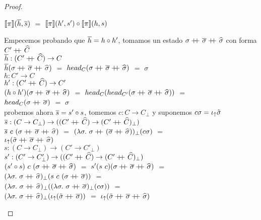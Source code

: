 \begin{proof}
\begin{itemize}
\begin{itemize}
\begin{center}
$\llbracket \pi \rrbracket(\overline{h},\overline{s})$ $=$ $\llbracket \pi \rrbracket(h',s') \circ \llbracket \pi \rrbracket(h,s)$
\end{center}

Empecemos probando que $\overline{h} = h \circ h'$, tomamos un estado 
$\sigma +\kern-1.3ex+\kern0.8ex \overline{\sigma} +\kern-1.3ex+\kern0.8ex \widehat{\sigma}$ con forma $C' +\kern-1.3ex+\kern0.8ex \widehat{C}$\\

$\overline{h} : (C' +\kern-1.3ex+\kern0.8ex \widehat{C}) \rightarrow C$\\
$\overline{h} (\sigma +\kern-1.3ex+\kern0.8ex \overline{\sigma} +\kern-1.3ex+\kern0.8ex \widehat{\sigma})$ $=$ 
$head_{C} (\sigma +\kern-1.3ex+\kern0.8ex \overline{\sigma} +\kern-1.3ex+\kern0.8ex \widehat{\sigma})$ $=$ $\sigma$\\

$h : C' \rightarrow C$\\
$h' : (C' +\kern-1.3ex+\kern0.8ex \widehat{C}) \rightarrow C'$\\
$(h \circ h') (\sigma +\kern-1.3ex+\kern0.8ex \overline{\sigma} +\kern-1.3ex+\kern0.8ex \widehat{\sigma})$ $=$
$head_{C}(head_{C'} (\sigma +\kern-1.3ex+\kern0.8ex \overline{\sigma} +\kern-1.3ex+\kern0.8ex \widehat{\sigma}))$ $=$\\
$head_{C}(\sigma +\kern-1.3ex+\kern0.8ex \overline{\sigma})$ $=$ $\sigma$\\

probemos ahora $\overline{s} = s' \circ s$, tomemos $c : C \rightarrow C_\bot$ y
suponemos $c \sigma = \iota_{\uparrow} \tilde{\sigma}$\\

$\overline{s} : (C \rightarrow C_\bot) \rightarrow 
		  ((C' +\kern-1.3ex+\kern0.8ex \widehat{C}) \rightarrow (C' +\kern-1.3ex+\kern0.8ex \widehat{C})_\bot)$\\
$\overline{s} \ c \ (\sigma +\kern-1.3ex+\kern0.8ex \overline{\sigma} +\kern-1.3ex+\kern0.8ex \widehat{\sigma})$ $=$
$(\lambda \sigma . \ 
	\sigma \concat (\sigmaover \concat \sigmahat))_{\bot} (c \sigma)$ $=$\\
$\iota_{\uparrow} (\tilde{\sigma} +\kern-1.3ex+\kern0.8ex \overline{\sigma} +\kern-1.3ex+\kern0.8ex \widehat{\sigma})$\\

$s : (C \rightarrow C_\bot) \rightarrow (C' \rightarrow C'_\bot)$\\
$s' : (C' \rightarrow C'_\bot) \rightarrow 
   	  ((C' +\kern-1.3ex+\kern0.8ex \widehat{C}) \rightarrow (C' +\kern-1.3ex+\kern0.8ex \widehat{C})_\bot)$\\
$(s' \circ s) \ c \ (\sigma +\kern-1.3ex+\kern0.8ex \overline{\sigma} +\kern-1.3ex+\kern0.8ex \widehat{\sigma})$ $=$
$s' (s \ c) (\sigma +\kern-1.3ex+\kern0.8ex \overline{\sigma} +\kern-1.3ex+\kern0.8ex \widehat{\sigma})$ $=$\\
$(\lambda \sigma. \ \sigma +\kern-1.3ex+\kern0.8ex \widehat{\sigma})_{\bot}
	(s \ c \ (\sigma +\kern-1.3ex+\kern0.8ex \overline{\sigma}))$ $=$\\
$(\lambda \sigma . \ \sigma +\kern-1.3ex+\kern0.8ex \widehat{\sigma})_{\bot}
((\lambda \sigma . \ \sigma +\kern-1.3ex+\kern0.8ex \overline{\sigma})_{\bot}(c \sigma))$ $=$\\
$(\lambda \sigma . \ \sigma +\kern-1.3ex+\kern0.8ex \widehat{\sigma})_{\bot}
(\iota_{\uparrow} (\tilde{\sigma} +\kern-1.3ex+\kern0.8ex \overline{\sigma}))$ $=$ 
$\iota_{\uparrow} (\tilde{\sigma} +\kern-1.3ex+\kern0.8ex \overline{\sigma} +\kern-1.3ex+\kern0.8ex \widehat{\sigma})$\\


\end{itemize}
\end{itemize}
\end{proof}
